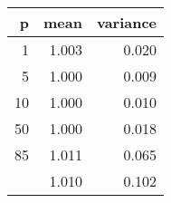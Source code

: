 
\begin{tabular}{rrr}
\toprule
p & mean & variance\\
\midrule
1 & 1.003 & 0.020\\
5 & 1.000 & 0.009\\
10 & 1.000 & 0.010\\
50 & 1.000 & 0.018\\
85 & 1.011 & 0.065\\
\addlinespace
90 & 1.010 & 0.102\\
\bottomrule
\end{tabular}
